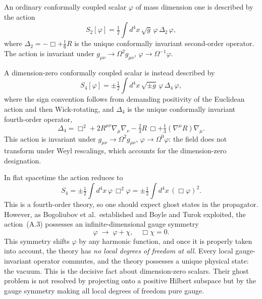 \documentclass[12pt,a4paper]{article}
\theoremstyle{remark}
\begin{document}
An ordinary conformally coupled scalar $\varphi$ of mass dimension one is described by the action
\begin{equation}
  S_2[\varphi] = \tfrac{1}{2}\int d^4x\,\sqrt{g}\,\varphi\,\Delta_2\,\varphi,
\end{equation}
where $\Delta_2 = -\Box + \tfrac{1}{6}R$ is the unique conformally invariant second-order
operator. The action is invariant under $g_{\mu\nu} \to \Omega^2 g_{\mu\nu}$,
$\varphi \to \Omega^{-1}\varphi$.

A dimension-zero conformally coupled scalar is instead described by
\begin{equation}
  S_4[\varphi] = \pm\tfrac{1}{2}\int d^4x\,\sqrt{\pm g}\,\varphi\,\Delta_4\,\varphi,
\end{equation}
where the sign convention follows from demanding positivity of the Euclidean action and then
Wick-rotating, and $\Delta_4$ is the unique conformally invariant fourth-order operator,
\begin{equation}
  \Delta_4 = \Box^2 + 2R^{\mu\nu}\nabla_\mu\nabla_\nu
             - \tfrac{2}{3}R\,\Box + \tfrac{1}{3}(\nabla^\mu R)\nabla_\mu.
\end{equation}
This action is invariant under $g_{\mu\nu} \to \Omega^2 g_{\mu\nu}$,
$\varphi \to \Omega^0\varphi$: the field does not transform under Weyl rescalings,
which accounts for the dimension-zero designation.

In flat spacetime the action reduces to
\begin{equation}
  S_4 = \pm\tfrac{1}{2}\int d^4x\,\varphi\,\Box^2\varphi
       = \pm\tfrac{1}{2}\int d^4x\,(\Box\varphi)^2.
\end{equation}
This is a fourth-order theory, so one should expect ghost states in the propagator. However,
as Bogoliubov et al.\ established and Boyle and Turok exploited, the action~(A.3) possesses
an infinite-dimensional gauge symmetry
\begin{equation}
  \varphi \;\longrightarrow\; \varphi + \chi, \quad \Box\chi = 0.
\end{equation}
This symmetry shifts $\varphi$ by any harmonic function, and once it is properly taken
into account, the theory has \emph{no local degrees of freedom at all}. Every local gauge-invariant
operator commutes, and the theory possesses a unique physical state: the vacuum. This is the
decisive fact about dimension-zero scalars. Their ghost problem is not resolved by projecting onto
a positive Hilbert subspace but by the gauge symmetry making all local degrees of freedom
pure gauge.
\end{document}
